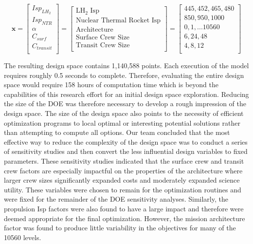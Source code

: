 \documentclass[]{aiaa-pretty}
\begin{document}
\begin{equation*}
\mathbf{x}=
\begin{bmatrix}
Isp_{LH_2}\\
Isp_{NTR}\\
\alpha\\
C_{surf}\\
C_{transit}\\
\end{bmatrix}
=
\begin{bmatrix}
\mbox{LH}_2\mbox{ Isp}\\
\mbox{Nuclear Thermal Rocket Isp}\\
\mbox{Architecture}\\
\mbox{Surface Crew Size}\\
\mbox{Transit Crew Size}\\
\end{bmatrix}
=
\begin{bmatrix}
445,452,465,480\\
850,950,1000\\
0,1,...10560\\
6,24,48\\
4,8,12\\
\end{bmatrix}
\end{equation*}

The resulting design space contains 1,140,588 points. Each execution of the model requires roughly 0.5 seconds to complete. Therefore, evaluating the entire design space would require 158 hours of computation time which is beyond the capabilities of this research effort for an initial design space exploration. Reducing the size of the DOE was therefore necessary to develop a rough impression of the design space. The size of the design space also points to the necessity of efficient optimization programs to local optimal or interesting potential solutions rather than attempting to compute all options. Our team concluded that the most effective way to reduce the complexity of the design space was to conduct a series of sensitivity studies and then convert the less influential design variables to fixed parameters. These sensitivity studies indicated that the surface crew and transit crew factors are especially impactful on the properties of the architecture where larger crew sizes significantly expanded costs and moderately expanded science utility. These variables were chosen to remain for the optimization routines and were fixed for the remainder of the DOE sensitivity analyses. Similarly, the propulsion Isp factors were also found to have a large impact and therefore were deemed appropriate for the final optimization. However, the mission architecture factor was found to produce little variability in the objectives for many of the 10560 levels. 
\end{document}
